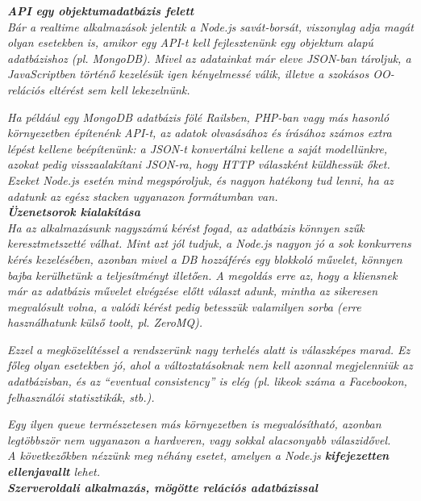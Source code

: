 \noindent\textit{\textbf{API egy objektumadatbázis felett}}\\

\textit{Bár a realtime alkalmazások jelentik a Node.js savát-borsát, viszonylag adja magát olyan esetekben is, amikor egy API-t kell fejlesztenünk egy objektum alapú adatbázishoz (pl. MongoDB). Mivel az adatainkat már eleve JSON-ban tároljuk, a JavaScriptben történő kezelésük igen kényelmessé válik, illetve a szokásos OO-relációs eltérést sem kell lekezelnünk.}

\textit{Ha például egy MongoDB adatbázis fölé Railsben, PHP-ban vagy más hasonló környezetben építenénk API-t, az adatok olvasásához és írásához számos extra lépést kellene beépítenünk: a JSON-t konvertálni kellene a saját modellünkre, azokat pedig visszaalakítani JSON-ra, hogy HTTP válaszként küldhessük őket. Ezeket Node.js esetén mind megspóroljuk, és nagyon hatékony tud lenni, ha az adatunk az egész stacken ugyanazon formátumban van.}\\

\noindent\textit{\textbf{Üzenetsorok kialakítása}}\\

\textit{Ha az alkalmazásunk nagyszámú kérést fogad, az adatbázis könnyen szűk keresztmetszetté válhat. Mint azt jól tudjuk, a Node.js nagyon jó a sok konkurrens kérés kezelésében, azonban mivel a DB hozzáférés egy blokkoló művelet, könnyen bajba kerülhetünk a teljesítményt illetően. A megoldás erre az, hogy a kliensnek már az adatbázis művelet elvégzése előtt választ adunk, mintha az sikeresen megvalósult volna, a valódi kérést pedig betesszük valamilyen sorba (erre használhatunk külső toolt, pl. ZeroMQ).}

\textit{Ezzel a megközelítéssel a rendszerünk nagy terhelés alatt is válaszképes marad. Ez főleg olyan esetekben jó, ahol a változtatásoknak nem kell azonnal megjelenniük az adatbázisban, és az “eventual consistency” is elég (pl. likeok száma a Facebookon, felhasználói statisztikák, stb.).}

\textit{Egy ilyen queue természetesen más környezetben is megvalósítható, azonban legtöbbször nem ugyanazon a hardveren, vagy sokkal alacsonyabb válaszidővel.}\\

\textit{A következőkben nézzünk meg néhány esetet, amelyen a Node.js \textbf{kifejezetten ellenjavallt} lehet.}\\

\noindent\textit{\textbf{Szerveroldali alkalmazás, mögötte relációs adatbázissal}}\\

